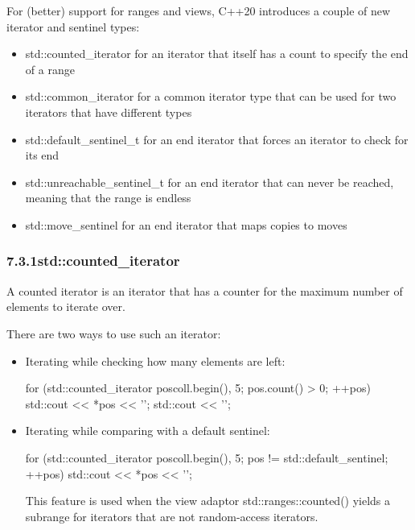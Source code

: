 
For (better) support for ranges and views, C++20 introduces a couple of new iterator and sentinel types:

\begin{itemize}
\item
std::counted\_iterator for an iterator that itself has a count to specify the end of a range

\item
std::common\_iterator for a common iterator type that can be used for two iterators that have different types

\item
std::default\_sentinel\_t for an end iterator that forces an iterator to check for its end

\item
std::unreachable\_sentinel\_t for an end iterator that can never be reached, meaning that the range is endless

\item
std::move\_sentinel for an end iterator that maps copies to moves
\end{itemize}

\subsubsection*{ 7.3.1\hspace{0.2cm}std::counted\_iterator}

A counted iterator is an iterator that has a counter for the maximum number of elements to iterate over.

There are two ways to use such an iterator:

\begin{itemize}
\item
Iterating while checking how many elements are left:

\begin{cpp}
for (std::counted_iterator pos{coll.begin(), 5}; pos.count() > 0; ++pos) {
	std::cout << *pos << '\n';
}
std::cout << '\n';
\end{cpp}

\item
Iterating while comparing with a default sentinel:

\begin{cpp}
for (std::counted_iterator pos{coll.begin(), 5};
pos != std::default_sentinel; ++pos) {
	std::cout << *pos << '\n';
}
\end{cpp}

This feature is used when the view adaptor std::ranges::counted() yields a subrange for iterators that are not random-access iterators.
\end{itemize}

